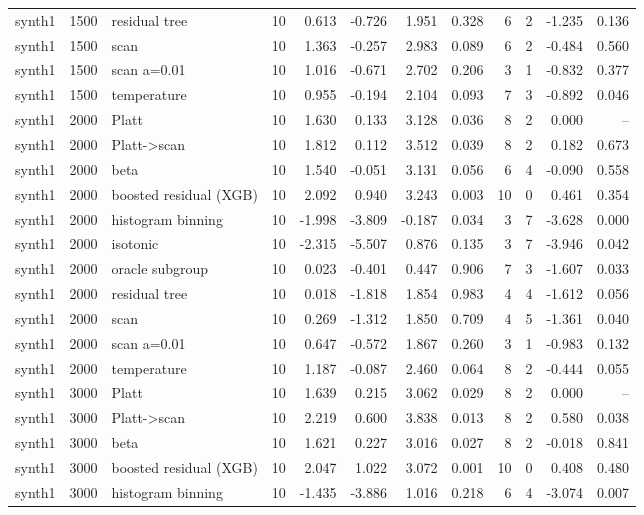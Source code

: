 \begin{tabular}{lllrrrrrrrrr}
synth1 & 1500 & residual tree & 10 & 0.613 & -0.726 & 1.951 & 0.328 & 6 & 2 & -1.235 & 0.136 \\
synth1 & 1500 & scan & 10 & 1.363 & -0.257 & 2.983 & 0.089 & 6 & 2 & -0.484 & 0.560 \\
synth1 & 1500 & scan a=0.01 & 10 & 1.016 & -0.671 & 2.702 & 0.206 & 3 & 1 & -0.832 & 0.377 \\
synth1 & 1500 & temperature & 10 & 0.955 & -0.194 & 2.104 & 0.093 & 7 & 3 & -0.892 & 0.046 \\
synth1 & 2000 & Platt & 10 & 1.630 & 0.133 & 3.128 & 0.036 & 8 & 2 & 0.000 & -- \\
synth1 & 2000 & Platt->scan & 10 & 1.812 & 0.112 & 3.512 & 0.039 & 8 & 2 & 0.182 & 0.673 \\
synth1 & 2000 & beta & 10 & 1.540 & -0.051 & 3.131 & 0.056 & 6 & 4 & -0.090 & 0.558 \\
synth1 & 2000 & boosted residual (XGB) & 10 & 2.092 & 0.940 & 3.243 & 0.003 & 10 & 0 & 0.461 & 0.354 \\
synth1 & 2000 & histogram binning & 10 & -1.998 & -3.809 & -0.187 & 0.034 & 3 & 7 & -3.628 & 0.000 \\
synth1 & 2000 & isotonic & 10 & -2.315 & -5.507 & 0.876 & 0.135 & 3 & 7 & -3.946 & 0.042 \\
synth1 & 2000 & oracle subgroup & 10 & 0.023 & -0.401 & 0.447 & 0.906 & 7 & 3 & -1.607 & 0.033 \\
synth1 & 2000 & residual tree & 10 & 0.018 & -1.818 & 1.854 & 0.983 & 4 & 4 & -1.612 & 0.056 \\
synth1 & 2000 & scan & 10 & 0.269 & -1.312 & 1.850 & 0.709 & 4 & 5 & -1.361 & 0.040 \\
synth1 & 2000 & scan a=0.01 & 10 & 0.647 & -0.572 & 1.867 & 0.260 & 3 & 1 & -0.983 & 0.132 \\
synth1 & 2000 & temperature & 10 & 1.187 & -0.087 & 2.460 & 0.064 & 8 & 2 & -0.444 & 0.055 \\
synth1 & 3000 & Platt & 10 & 1.639 & 0.215 & 3.062 & 0.029 & 8 & 2 & 0.000 & -- \\
synth1 & 3000 & Platt->scan & 10 & 2.219 & 0.600 & 3.838 & 0.013 & 8 & 2 & 0.580 & 0.038 \\
synth1 & 3000 & beta & 10 & 1.621 & 0.227 & 3.016 & 0.027 & 8 & 2 & -0.018 & 0.841 \\
synth1 & 3000 & boosted residual (XGB) & 10 & 2.047 & 1.022 & 3.072 & 0.001 & 10 & 0 & 0.408 & 0.480 \\
synth1 & 3000 & histogram binning & 10 & -1.435 & -3.886 & 1.016 & 0.218 & 6 & 4 & -3.074 & 0.007 \\

\end{tabular}
